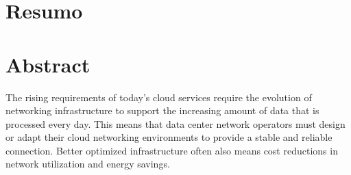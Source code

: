 \chapter*{Resumo}

\chapter*{Abstract}

The rising requirements of today's cloud services require the evolution of networking infrastructure to support the increasing amount of data that is processed
every day. This means that data center network operators must design or adapt their cloud networking environments to provide a stable and reliable connection.
Better optimized infrastructure often also means cost reductions in network utilization and energy savings.
